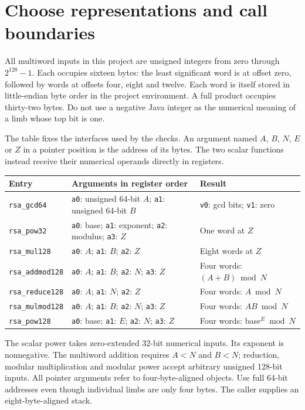 \section{Choose representations and call boundaries}
All multiword inputs in this project are unsigned integers from zero through
\(2^{128}-1\). Each occupies sixteen bytes: the least significant word is at offset
zero, followed by words at offsets four, eight and twelve. Each word is itself stored
in little-endian byte order in the project environment. A full product occupies
thirty-two bytes. Do not use a negative Java integer as the numerical meaning of a
limb whose top bit is one.

The table fixes the interfaces used by the checks. An argument named \(A\), \(B\),
\(N\), \(E\) or \(Z\) in a pointer position is the address of its bytes. The two
scalar functions instead receive their numerical operands directly in registers.
\begin{longtable}{p{}p{}p{}}
Entry & Arguments in register order & Result \\
\hline
\texttt{rsa\_gcd64} & \texttt{a0}: unsigned 64-bit \(A\); \texttt{a1}: unsigned 64-bit \(B\) & \texttt{v0}: gcd bits; \texttt{v1}: zero \\
\texttt{rsa\_pow32} & \texttt{a0}: base; \texttt{a1}: exponent; \texttt{a2}: modulus; \texttt{a3}: \(Z\) & One word at \(Z\) \\
\texttt{rsa\_mul128} & \texttt{a0}: \(A\); \texttt{a1}: \(B\); \texttt{a2}: \(Z\) & Eight words at \(Z\) \\
\texttt{rsa\_addmod128} & \texttt{a0}: \(A\); \texttt{a1}: \(B\); \texttt{a2}: \(N\); \texttt{a3}: \(Z\) & Four words: \((A+B)\bmod N\) \\
\texttt{rsa\_reduce128} & \texttt{a0}: \(A\); \texttt{a1}: \(N\); \texttt{a2}: \(Z\) & Four words: \(A\bmod N\) \\
\texttt{rsa\_mulmod128} & \texttt{a0}: \(A\); \texttt{a1}: \(B\); \texttt{a2}: \(N\); \texttt{a3}: \(Z\) & Four words: \(AB\bmod N\) \\
\texttt{rsa\_pow128} & \texttt{a0}: base; \texttt{a1}: \(E\); \texttt{a2}: \(N\); \texttt{a3}: \(Z\) & Four words: base\(^{E}\bmod N\) \\
\end{longtable}

The scalar power takes zero-extended 32-bit numerical inputs. Its exponent is
nonnegative. The multiword addition requires \(A<N\) and \(B<N\); reduction, modular
multiplication and modular power accept arbitrary unsigned 128-bit inputs. All pointer
arguments refer to four-byte-aligned objects. Use full 64-bit addresses even though
individual limbs are only four bytes. The caller supplies an eight-byte-aligned stack.

